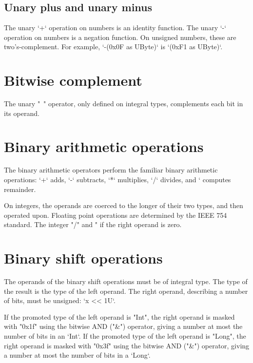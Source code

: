 \subsection{Unary plus and unary minus}

The unary \xcd`+` operation on numbers is an identity function.
The unary \xcd`-` operation on numbers is a negation function.
On unsigned numbers, these are two's-complement.  For example, 
\xcd`-(0x0F as UByte)` is 
\xcd`(0xF1 as UByte)`.



\section{Bitwise complement}

The unary \xcd"~" operator, only defined on integral types, complements each
bit in its operand.  

\section{Binary arithmetic operations} 

The binary arithmetic operators perform the familiar binary arithmetic
operations: \xcd`+` adds, \xcd`-` subtracts, \xcd`*` multiplies, 
\xcd`/` divides, and \xcd`%
computes remainder.

On integers, the operands are coerced to the longer of their two types, and
then operated upon.  
Floating point operations are determined by the IEEE 754
standard. 
The integer \xcd"/" and \xcd"%
if the right operand is zero.



\section{Binary shift operations}

The operands of the binary shift operations must be of integral type.
The type of the result is the type of the left operand.
The right operand, describing a number of bits, must be unsigned: 
\xcd`x << 1U`.  


If the promoted type of the left operand is \xcd"Int",
the right operand is masked with \xcd"0x1f" using the bitwise
AND (\xcd"&") operator, giving a number at most the number of bits in an
\xcd`Int`. 
If the promoted type of the left operand is \xcd"Long",
the right operand is masked with \xcd"0x3f" using the bitwise
AND (\xcd"&") operator, giving a number at most the number of bits in a
\xcd`Long`. 

